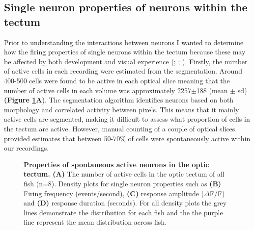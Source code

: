 \subsection{Single neuron properties of neurons within the tectum}
Prior to understanding the interactions between neurons I wanted to determine how the firing properties of single neurons within the tectum because these may be affected by  both development and visual experience (\cite{Pietri2017}; \cite{Avitan2016}; \cite{Pratt2007HomeostaticCircuit}). Firstly, the number of active cells in each recording were estimated from the segmentation. Around 400-500 cells were found to be active in each optical slice meaning that the number of active cells in each volume was approximately 2257$\pm$188 (mean $\pm$ \gls{sd}) \textbf{(Figure \ref{fig:R1_F2}A}). The segmentation algorithm identifies neurons based on both morphology and correlated activity between pixels. This means that it mainly active cells are segmented, making it difficult to assess what proportion of cells in the tectum are active. However, manual counting of a couple of optical slices provided estimates that between 50-70\% of cells were spontaneously active within our recordings. 

\begin{figure}[!htb]
        \caption[\label{fig:R1_F2}  \textbf{Response properties of spontaneously active neurons.}]{\label{fig:R1_F2}  \textbf{Properties of spontaneous active neurons in the optic tectum. (A)} The number of active cells in the optic tectum of all fish (n=8). Density plots for single neuron properties such as \textbf{(B)} Firing frequency (events/second), \textbf{(C)} response amplitude  ($\Delta$F/F) and \textbf{(D)} response duration (seconds). For all density plots the grey lines demonstrate the distribution for each fish and the the purple line represent the mean distribution across fish.}
      \end{figure}


